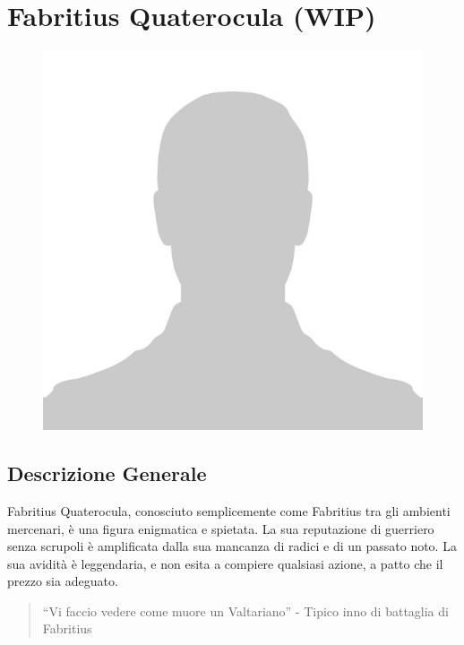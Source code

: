 \section{Fabritius Quaterocula (WIP)}\label{fabritius-quaterocula-wip}


\begin{figure}
\centering
\includegraphics{No-Photo-Available-591x591-2.jpg}
\end{figure}

\subsection{Descrizione Generale}\label{descrizione-generale}



Fabritius Quaterocula, conosciuto semplicemente come Fabritius tra gli
ambienti mercenari, è una figura enigmatica e spietata. La sua
reputazione di guerriero senza scrupoli è amplificata dalla sua mancanza
di radici e di un passato noto. La sua avidità è leggendaria, e non
esita a compiere qualsiasi azione, a patto che il prezzo sia adeguato.

\begin{quote}
``Vi faccio vedere come muore un Valtariano'' - Tipico inno di battaglia
di Fabritius
\end{quote}

